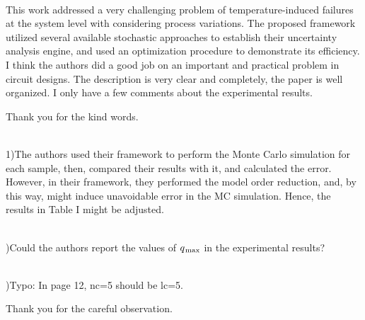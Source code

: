 \begin{reviewer}
\\
This work addressed a very challenging problem of temperature-induced failures
at the system level with considering process variations. The proposed framework
utilized several available stochastic approaches to establish their uncertainty
analysis engine, and used an optimization procedure to demonstrate its
efficiency. I think the authors did a good job on an important and practical
problem in circuit designs. The description is very clear and completely, the
paper is well organized. I only have a few comments about the experimental
results.
\end{reviewer}

\begin{authors}
  Thank you for the kind words.
\end{authors}

\begin{reviewer}
\noindent{}\\
1)The authors used their framework to perform the Monte Carlo
simulation for each sample, then, compared their results with it, and
calculated the error. However, in their framework, they performed the model
order reduction, and, by this way, might induce unavoidable error in the MC
simulation. Hence, the results in Table I might be adjusted.
\end{reviewer}

\begin{authors}
\begin{actions}
\end{actions}
\end{authors}

\begin{reviewer}
\\
)Could the authors report the values of $q_{\text{\kern0.1emmax}}$ in the
experimental results?
\end{reviewer}

\begin{authors}
\begin{actions}
\end{actions}
\end{authors}

\begin{reviewer}
\\
)Typo: In page 12, nc=5 should be lc=5.
\end{reviewer}

\begin{authors}
  Thank you for the careful observation.

\begin{actions}
\end{actions}
\end{authors}
